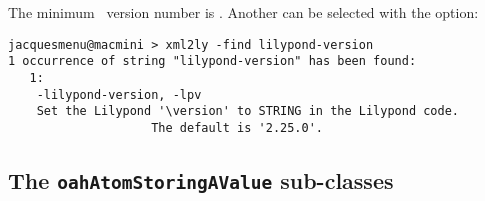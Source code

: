 The minimum \lily\ version number is . Another can be selected with the  option:
\begin{lstlisting}[language=Terminal]
jacquesmenu@macmini > xml2ly -find lilypond-version
1 occurrence of string "lilypond-version" has been found:
   1:
    -lilypond-version, -lpv
    Set the Lilypond '\version' to STRING in the Lilypond code.
                    The default is '2.25.0'.
\end{lstlisting}


\subsection{The {\tt oahAtomStoringAValue} sub-classes}

